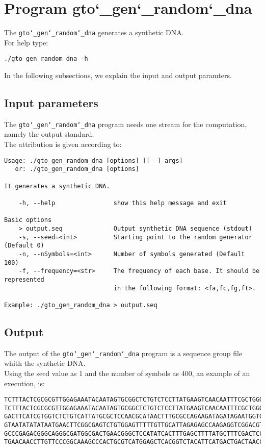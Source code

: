 \section{Program gto\char`_gen\char`_random\char`_dna}
The \texttt{gto\char`_gen\char`_random\char`_dna} generates a synthetic DNA.\\
For help type:
\begin{lstlisting}
./gto_gen_random_dna -h
\end{lstlisting}
In the following subsections, we explain the input and output paramters.

\subsection*{Input parameters}

The \texttt{gto\char`_gen\char`_random\char`_dna} program needs one stream for the computation,
namely the output standard.\\
The attribution is given according to:
\begin{lstlisting}
Usage: ./gto_gen_random_dna [options] [[--] args]
   or: ./gto_gen_random_dna [options]

It generates a synthetic DNA.

    -h, --help                show this help message and exit

Basic options
    > output.seq              Output synthetic DNA sequence (stdout)
    -s, --seed=<int>          Starting point to the random generator (Default 0)
    -n, --nSymbols=<int>      Number of symbols generated (Default 100)
    -f, --frequency=<str>     The frequency of each base. It should be represented 
    						  in the following format: <fa,fc,fg,ft>.

Example: ./gto_gen_random_dna > output.seq
\end{lstlisting}

\subsection*{Output}
The output of the \texttt{gto\char`_gen\char`_random\char`_dna} program is a sequence group file whith the synthetic DNA.\\
Using the seed value as 1 and the number of symbols as 400, an example of an execution, is: 
\begin{lstlisting}
TCTTTACTCGCGCGTTGGAGAAATACAATAGTGCGGCTCTGTCTCCTTATGAAGTCAACAATTTCGCTGGGACTTGCGGC
TCTTTACTCGCGCGTTGGAGAAATACAATAGTGCGGCTCTGTCTCCTTATGAAGTCAACAATTTCGCTGGGACTTGCGGC
GACTTCATCGTGGTCTCTGTCATTATGCGCTCCAACGCATAACTTTGCGCCAGAAGATAGATAGAATGGTGTAAGAAACT
GTAATATATATAATGAACTTCGGCGAGTCTGTGGAGTTTTTGTTGCATTAGAGAGCCAAGAGGTCGGACGTCCTCACGTA
GCCCGAGACGGGCAGGGCGATGGCGACTGAACGGGCTCCATATCACTTTGAGCTTTTATGCTTTCGACTCCTCCAGGAGC
TGAACAACCTTGTTCCCGGCAAAGCCCACTGCGTCATGGAGCTCACGGTCTACATTCATGACTGACTAACCGTAAACTGC
\end{lstlisting}

